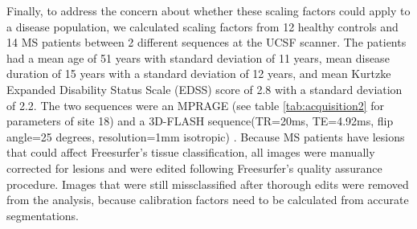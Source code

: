Finally, to address the concern about whether these scaling factors could apply to a disease population, we calculated scaling factors from 12 healthy controls and 14 MS patients between 2 different sequences at the UCSF scanner. The patients had a mean age of 51 years with standard deviation of 11 years, mean disease duration of 15 years with a standard deviation of 12 years, and mean Kurtzke Expanded Disability Status Scale (EDSS) score of 2.8 with a standard deviation of 2.2. The two sequences were an MPRAGE (see table \ref{tab:acquisition2} for parameters of site 18) and a 3D-FLASH sequence(TR=20ms, TE=4.92ms, flip angle=25 degrees, resolution=1mm isotropic) . Because MS patients have lesions that could affect Freesurfer's tissue classification, all images were manually corrected for lesions and were edited following Freesurfer's quality assurance procedure. Images that were still missclassified after thorough edits were removed from the analysis, because calibration factors need to be calculated from accurate segmentations.